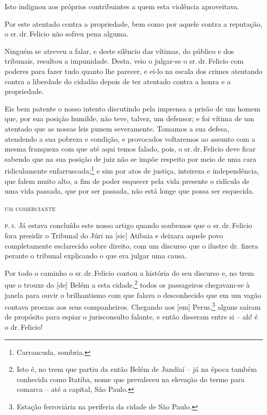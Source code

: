 Isto indignou aos próprios contribuintes a quem esta violência
aproveitava.

Por este atentado contra a propriedade, bem como por aquele contra a
reputação, o sr.\,dr.\,Felicio não sofreu pena alguma.

Ninguém se atreveu a falar, e deste silêncio das vítimas, do público e
dos tribunais, resultou a impunidade. Desta, veio o julgar-se o sr.\,dr.\,Felicio com poderes para fazer tudo quanto lhe parecer, e ei-lo na
escala dos crimes atentando contra a liberdade do cidadão depois de ter
atentado contra a honra e a propriedade.

Eis bem patente o nosso intento discutindo pela imprensa a prisão de um
homem que, por sua posição humilde, não teve, talvez, um defensor; e foi
vítima de um atentado que as nossas leis punem severamente. Tomamos a
sua defesa, atendendo a sua pobreza e condição, e provocados voltaremos
ao assunto com a mesma franqueza com que até aqui temos falado, pois, o
sr.\,dr.\,Felicio deve ficar sabendo que na sua posição de juiz não se
impõe respeito por meio de uma cara ridiculamente
enfarruscada;\footnote{ Carrancuda, sombria.} e sim por atos de
justiça, inteireza e independência, que falem muito alto, a fim de poder
esquecer pela vida presente o ridículo de uma vida passada, que por ser
passada, não está longe que possa ser esquecida.

\begin{flushright}
\textsc{um comerciante}
\end{flushright}

\textsc{p.\,s.} Já estava concluído este nosso artigo quando soubemos que o sr.\,dr.\,Felicio fora presidir o Tribunal do Júri na {[}sic{]} Atibaia e
deixara aquele povo completamente esclarecido sobre direito, com um
discurso que o ilustre dr. fizera perante o tribunal explicando o que
era julgar uma causa.

Por todo o caminho o sr.\,dr.\,Felicio contou a história do seu discurso
e, no trem que o trouxe do {[}de{]} Belém a esta cidade,\footnote{ Isto
  é, no trem que partiu da então Belém de Jundiaí -- já na época também
  conhecida como Itatiba, nome que prevaleceu na elevação do termo para
  comarca -- até a capital, São Paulo.} todos os passageiros chegavam-se
à janela para ouvir o brilhantismo com que falava o desconhecido que em
um vagão contava proezas aos seus companheiros. Chegando aos {[}em{]}
Perus,\footnote{ Estação ferroviária na periferia da cidade de São
  Paulo.} alguns saíram de propósito para espiar o jurisconsulto
falante, e então disseram entre si -- ah! é o dr.\,Felicio!

